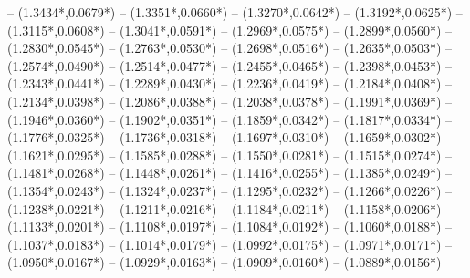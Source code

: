 {	-- ({1.3434*\dx},{0.0679*\dy})
	-- ({1.3351*\dx},{0.0660*\dy})
	-- ({1.3270*\dx},{0.0642*\dy})
	-- ({1.3192*\dx},{0.0625*\dy})
	-- ({1.3115*\dx},{0.0608*\dy})
	-- ({1.3041*\dx},{0.0591*\dy})
	-- ({1.2969*\dx},{0.0575*\dy})
	-- ({1.2899*\dx},{0.0560*\dy})
	-- ({1.2830*\dx},{0.0545*\dy})
	-- ({1.2763*\dx},{0.0530*\dy})
	-- ({1.2698*\dx},{0.0516*\dy})
	-- ({1.2635*\dx},{0.0503*\dy})
	-- ({1.2574*\dx},{0.0490*\dy})
	-- ({1.2514*\dx},{0.0477*\dy})
	-- ({1.2455*\dx},{0.0465*\dy})
	-- ({1.2398*\dx},{0.0453*\dy})
	-- ({1.2343*\dx},{0.0441*\dy})
	-- ({1.2289*\dx},{0.0430*\dy})
	-- ({1.2236*\dx},{0.0419*\dy})
	-- ({1.2184*\dx},{0.0408*\dy})
	-- ({1.2134*\dx},{0.0398*\dy})
	-- ({1.2086*\dx},{0.0388*\dy})
	-- ({1.2038*\dx},{0.0378*\dy})
	-- ({1.1991*\dx},{0.0369*\dy})
	-- ({1.1946*\dx},{0.0360*\dy})
	-- ({1.1902*\dx},{0.0351*\dy})
	-- ({1.1859*\dx},{0.0342*\dy})
	-- ({1.1817*\dx},{0.0334*\dy})
	-- ({1.1776*\dx},{0.0325*\dy})
	-- ({1.1736*\dx},{0.0318*\dy})
	-- ({1.1697*\dx},{0.0310*\dy})
	-- ({1.1659*\dx},{0.0302*\dy})
	-- ({1.1621*\dx},{0.0295*\dy})
	-- ({1.1585*\dx},{0.0288*\dy})
	-- ({1.1550*\dx},{0.0281*\dy})
	-- ({1.1515*\dx},{0.0274*\dy})
	-- ({1.1481*\dx},{0.0268*\dy})
	-- ({1.1448*\dx},{0.0261*\dy})
	-- ({1.1416*\dx},{0.0255*\dy})
	-- ({1.1385*\dx},{0.0249*\dy})
	-- ({1.1354*\dx},{0.0243*\dy})
	-- ({1.1324*\dx},{0.0237*\dy})
	-- ({1.1295*\dx},{0.0232*\dy})
	-- ({1.1266*\dx},{0.0226*\dy})
	-- ({1.1238*\dx},{0.0221*\dy})
	-- ({1.1211*\dx},{0.0216*\dy})
	-- ({1.1184*\dx},{0.0211*\dy})
	-- ({1.1158*\dx},{0.0206*\dy})
	-- ({1.1133*\dx},{0.0201*\dy})
	-- ({1.1108*\dx},{0.0197*\dy})
	-- ({1.1084*\dx},{0.0192*\dy})
	-- ({1.1060*\dx},{0.0188*\dy})
	-- ({1.1037*\dx},{0.0183*\dy})
	-- ({1.1014*\dx},{0.0179*\dy})
	-- ({1.0992*\dx},{0.0175*\dy})
	-- ({1.0971*\dx},{0.0171*\dy})
	-- ({1.0950*\dx},{0.0167*\dy})
	-- ({1.0929*\dx},{0.0163*\dy})
	-- ({1.0909*\dx},{0.0160*\dy})
	-- ({1.0889*\dx},{0.0156*\dy})
}
